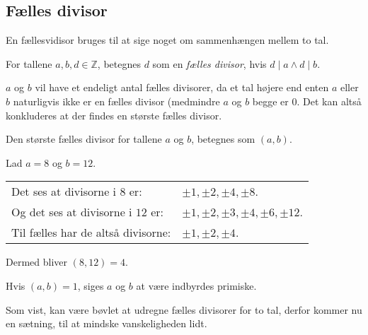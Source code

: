 

\subsection{Fælles divisor}
En fællesvidisor bruges til at sige noget om sammenhængen mellem to tal.

\begin{definition}
    For tallene \(a, b, d \in \mathbb{Z}\), betegnes \(d\) som en \emph{fælles divisor}, hvis \(d \mid a \land d \mid b\).
\end{definition}

\(a\) og \(b\) vil have et endeligt antal fælles divisorer, da et tal højere end enten \(a\) eller \(b\) naturligvis ikke er en fælles divisor (medmindre \(a\) og \(b\) begge er \(0\).
Det kan altså konkluderes at der findes en største fælles divisor.

\begin{definition}
    Den største fælles divisor for tallene \(a\) og \(b\), betegnes som \((a, b)\).
\end{definition}

\begin{eks}
    Lad \(a = 8\) og \(b = 12\).\\
    \begin{tabular*}{\textwidth}{@{} l l}
        Det ses at divisorne i \(8\) er:      & \(\pm 1, \pm 2, \pm 4, \pm 8\).\\
        Og det ses at divisorne i \(12\) er:  &\(\pm 1, \pm 2, \pm 3, \pm 4, \pm 6, \pm 12\).\\
        Til fælles har de altså divisorne:    & \(\pm 1, \pm 2, \pm 4\).
    \end{tabular*}
    Dermed bliver \((8, 12) = 4\).
\end{eks}


\begin{definition}
    Hvis \((a, b) = 1\), siges \(a\) og \(b\) at være indbyrdes primiske.
\end{definition}

Som vist, kan være bøvlet at udregne fælles divisorer for to tal, derfor kommer nu en sætning, til at mindske vanskeligheden lidt.


